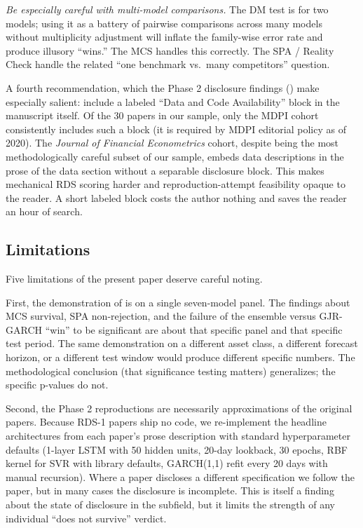\textit{Be especially careful with multi-model comparisons.} The DM test is for two models; using it as a battery of pairwise comparisons across many models without multiplicity adjustment will inflate the family-wise error rate and produce illusory ``wins.'' The MCS handles this correctly. The SPA / Reality Check handle the related ``one benchmark vs.\ many competitors'' question.

A fourth recommendation, which the Phase 2 disclosure findings () make especially salient: include a labeled ``Data and Code Availability'' block in the manuscript itself. Of the 30 papers in our sample, only the MDPI cohort consistently includes such a block (it is required by MDPI editorial policy as of 2020). The \emph{Journal of Financial Econometrics} cohort, despite being the most methodologically careful subset of our sample, embeds data descriptions in the prose of the data section without a separable disclosure block. This makes mechanical RDS scoring harder and reproduction-attempt feasibility opaque to the reader. A short labeled block costs the author nothing and saves the reader an hour of search.

\subsection{Limitations}\label{sec:limitations}

Five limitations of the present paper deserve careful noting.

First, the demonstration of  is on a single seven-model panel. The findings about MCS survival, SPA non-rejection, and the failure of the ensemble versus GJR-GARCH ``win'' to be significant are about that specific panel and that specific test period. The same demonstration on a different asset class, a different forecast horizon, or a different test window would produce different specific numbers. The methodological conclusion (that significance testing matters) generalizes; the specific p-values do not.

Second, the Phase 2 reproductions are necessarily approximations of the original papers. Because RDS-1 papers ship no code, we re-implement the headline architectures from each paper's prose description with standard hyperparameter defaults (1-layer LSTM with 50 hidden units, 20-day lookback, 30 epochs, RBF kernel for SVR with library defaults, GARCH(1,1) refit every 20 days with manual recursion). Where a paper discloses a different specification we follow the paper, but in many cases the disclosure is incomplete. This is itself a finding about the state of disclosure in the subfield, but it limits the strength of any individual ``does not survive'' verdict.


